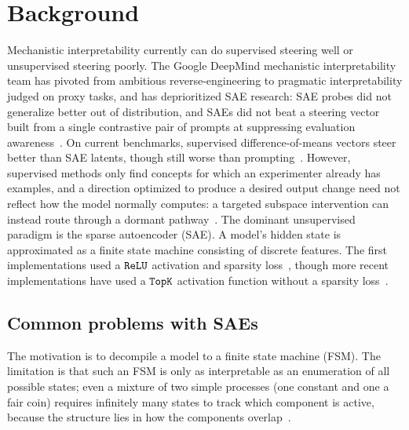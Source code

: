 \section{Background}
Mechanistic interpretability currently can do supervised steering well
or unsupervised steering poorly. The Google DeepMind mechanistic
interpretability team has pivoted from ambitious reverse-engineering to
pragmatic interpretability judged on proxy tasks, and has deprioritized
SAE research: SAE probes did not generalize better out of distribution,
and SAEs did not beat a steering vector built from a single contrastive
pair of prompts at suppressing evaluation
awareness~\cite{gdmprogress2025}. On current benchmarks, supervised
difference-of-means vectors steer better than SAE latents, though still
worse than prompting~\cite{wu2025axbenchsteeringllmssimple}. However,
supervised methods only find concepts for which an experimenter already
has examples, and a direction optimized to produce a desired output
change need not reflect how the model normally computes: a targeted
subspace intervention can instead route through a dormant
pathway~\cite{makelov2023}. The dominant
unsupervised paradigm is the sparse autoencoder (SAE). A model's hidden
state is approximated as a finite state machine consisting of discrete
features. The first implementations used a $\mathop{\mathtt{ReLU}}\limits$ activation and
sparsity loss~\cite{cunningham2023,bricken2023}, though more recent
implementations have used a $\mathop{\mathtt{TopK}}\limits$ activation function without a
sparsity loss~\cite{gao2024}.

\subsection{Common problems with SAEs}
The motivation is to decompile a model to a finite state machine (FSM).
The limitation is that such an FSM is only as interpretable as an
enumeration of all possible states; even a mixture of two simple
processes (one constant and one a fair coin) requires infinitely many
states to track which component is active, because the structure lies in
how the components overlap~\cite{crutchfield2026}.

